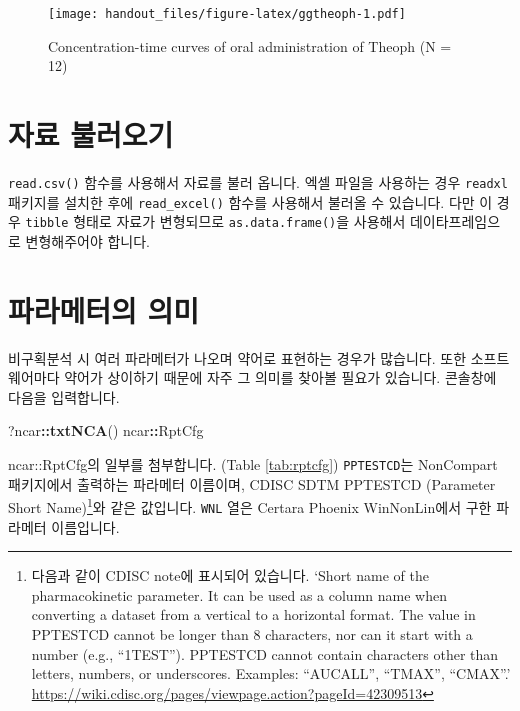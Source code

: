 \documentclass[9pt,]{krantz}
\newenvironment{Shaded}{\begin{snugshade}}{\end{snugshade}}
\newcommand{\KeywordTok}[1]{\textcolor[rgb]{0.13,0.29,0.53}{\textbf{#1}}}
\newcommand{\NormalTok}[1]{#1}
\newcommand{\OperatorTok}[1]{\textcolor[rgb]{0.81,0.36,0.00}{\textbf{#1}}}
\begin{document}
\begin{figure}
\centering
\texttt{[image: handout\_files/figure-latex/ggtheoph-1.pdf]}
\caption{\label{fig:ggtheoph}Concentration-time curves of oral administration of Theoph (N = 12)}
\end{figure}

\hypertarget{loading}{%
\section{자료 불러오기}\label{loading}}

\texttt{read.csv()} 함수를 사용해서 자료를 불러 옵니다.
엑셀 파일을 사용하는 경우 \texttt{readxl} 패키지를 설치한 후에 \texttt{read\_excel()} 함수를 사용해서 불러올 수 있습니다.
다만 이 경우 \texttt{tibble} 형태로 자료가 변형되므로 \texttt{as.data.frame()}을 사용해서 데이타프레임으로 변형해주어야 합니다.

\hypertarget{parameters}{%
\section{파라메터의 의미}\label{parameters}}

비구획분석 시 여러 파라메터가 나오며 약어로 표현하는 경우가 많습니다. 또한 소프트웨어마다 약어가 상이하기 때문에 자주 그 의미를 찾아볼 필요가 있습니다. 콘솔창에 다음을 입력합니다.

\begin{Shaded}
\begin{Highlighting}[]
\NormalTok{?ncar}\OperatorTok{::}\KeywordTok{txtNCA}\NormalTok{()}
\NormalTok{ncar}\OperatorTok{::}\NormalTok{RptCfg}
\end{Highlighting}
\end{Shaded}

ncar::RptCfg의 일부를 첨부합니다. (Table \ref{tab:rptcfg}) \texttt{PPTESTCD}는 NonCompart 패키지에서 출력하는 파라메터 이름이며, CDISC SDTM PPTESTCD (Parameter Short Name)\footnote{다음과 같이 CDISC note에 표시되어 있습니다. `Short name of the pharmacokinetic parameter. It can be used as a column name when converting a dataset from a vertical to a horizontal format. The value in PPTESTCD cannot be longer than 8 characters, nor can it start with a number (e.g., ``1TEST''). PPTESTCD cannot contain characters other than letters, numbers, or underscores. Examples: ``AUCALL'', ``TMAX'', ``CMAX''.' \url{https://wiki.cdisc.org/pages/viewpage.action?pageId=42309513}}와 같은 값입니다. \texttt{WNL} 열은 Certara Phoenix WinNonLin에서 구한 파라메터 이름입니다.
\end{document}
